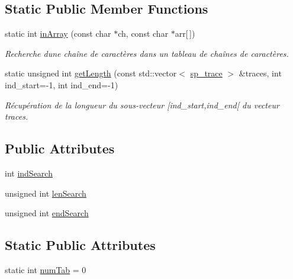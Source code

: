 \subsection*{Static Public Member Functions}
\begin{DoxyCompactItemize}
\item 
static int \hyperlink{class_trace_ac641a642889e5f527402b45e7c8908a1}{in\+Array} (const char $\ast$ch, const char $\ast$arr\mbox{[}$\,$\mbox{]})
\begin{DoxyCompactList}\small\item\em Recherche d\textquotesingle{}une chaîne de caractères dans un tableau de chaînes de caractères. \end{DoxyCompactList}\item 
static unsigned int \hyperlink{class_trace_a479e20e1158483aa60f656419160da97}{get\+Length} (const std\+::vector$<$ \hyperlink{class_trace_a9c58e523529fc8a03fb6acf3eef86150}{sp\+\_\+trace} $>$ \&traces, int ind\+\_\+start=-\/1, int ind\+\_\+end=-\/1)
\begin{DoxyCompactList}\small\item\em Récupération de la longueur du sous-\/vecteur \mbox{[}ind\+\_\+start,ind\+\_\+end\mbox{[} du vecteur {\ttfamily traces}. \end{DoxyCompactList}\end{DoxyCompactItemize}
\subsection*{Public Attributes}
\begin{DoxyCompactItemize}
\item 
int \hyperlink{class_trace_ae1aa55b6282f5dae12f63b0282ef4b9d}{ind\+Search}
\item 
unsigned int \hyperlink{class_trace_a37d1196b3efa0038af8dcbb7701fcd91}{len\+Search}
\item 
unsigned int \hyperlink{class_trace_a8c8413995806feaeebda9f5360db9dbd}{end\+Search}
\end{DoxyCompactItemize}
\subsection*{Static Public Attributes}
\begin{DoxyCompactItemize}
\item 
static int \hyperlink{class_trace_a21ee84e87f59ed66eb6fa505cc6bf637}{num\+Tab} = 0
\end{DoxyCompactItemize}
